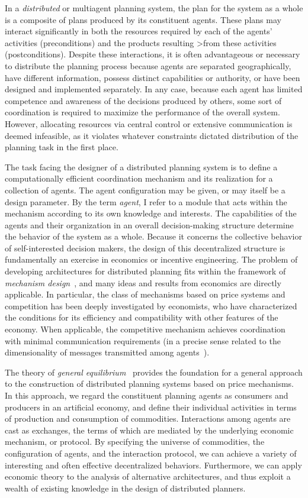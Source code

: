 In a {\em distributed\/} or multiagent planning system, the plan for the
system as a whole is a composite of plans produced by its constituent
agents.
These plans may interact significantly in both the resources 
required by
each of the agents' activities (preconditions) and the products resulting
>from these activities (postconditions).
Despite these interactions, it is often advantageous or necessary to 
distribute the planning process because agents are separated geographically,
have different information, 
possess distinct capabilities or authority, or have been designed and 
implemented separately.
In any case, because each agent has limited competence and awareness of the 
decisions produced by others, some sort of coordination is required to 
maximize the performance of the overall system.
However, allocating resources via central control or extensive communication 
is deemed infeasible, as it violates whatever constraints dictated
distribution of the planning task in the first place.

The task facing the designer of a distributed planning system is to define
a computationally efficient coordination mechanism and its realization for
a collection of agents.  The agent configuration may be given, or may 
itself be a design parameter.
By the term {\em agent}, I refer to a module that acts within the mechanism
according to its own knowledge and interests.
The capabilities of the agents and their organization in an overall 
decision-making structure determine the behavior of the system as a whole.
Because it concerns the collective behavior of self-interested 
decision makers, the design of this decentralized structure is 
fundamentally an exercise in economics or incentive engineering.
The problem of developing architectures for distributed planning fits 
within the framework of {\em mechanism design}~\cite{Hurwicz77,Reiter86},
and many ideas and results from economics are directly applicable.
In particular, the class of mechanisms based on price systems and 
competition has been deeply investigated by economists, who have 
characterized the conditions for its efficiency and compatibility with 
other features of the economy.
When applicable, the competitive mechanism achieves coordination with 
minimal communication requirements (in a precise sense related to the 
dimensionality of messages transmitted among agents~\cite{Reiter86}).

The theory of {\em general equilibrium\/}~\cite{Hildenbrand76}
provides the foundation for a general approach to the construction of
distributed planning systems based on price mechanisms.
In this approach, we regard the constituent planning agents as consumers 
and producers in an artificial economy, and define their individual activities in 
terms of production and consumption of commodities.
Interactions among agents are cast as exchanges, the 
terms of which are mediated by the underlying economic mechanism, or 
protocol.
By specifying the universe of commodities, the configuration of agents, 
and the interaction protocol, we can achieve a variety of interesting and 
often effective decentralized behaviors.
Furthermore, we can apply economic theory to the analysis of alternative
architectures, and thus exploit a wealth of existing knowledge 
in the design of distributed planners.

